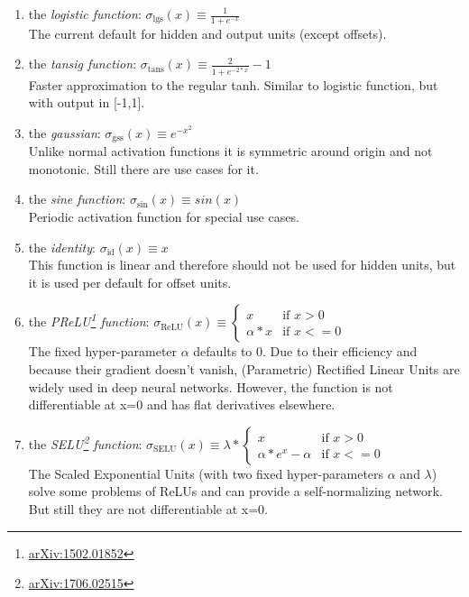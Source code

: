 \documentclass[11pt,a4paper,twoside]{article}
\newcommand{\logaf}{\sigma_{\text{lgs}}}
\newcommand{\tansaf}{\sigma_{\text{tans}}}
\newcommand{\gssaf}{\sigma_{\text{gss}}}
\newcommand{\sinaf}{\sigma_{\text{sin}}}
\newcommand{\idaf}{\sigma_{\text{id}}}
\newcommand{\reluaf}{\sigma_{\text{ReLU}}}
\newcommand{\seluaf}{\sigma_{\text{SELU}}}
\begin{document}
\begin{enumerate}
\item the \emph{logistic function}: $\logaf(x) \equiv \frac{1}{1+e^{-x}}$ \\
The current default for hidden and output units (except offsets).
\item the \emph{tansig function}: $\tansaf(x) \equiv \frac{2}{1+e^{-2*x}} - 1$ \\
Faster approximation to the regular tanh. Similar to logistic function, but with output in [-1,1].  
\item the \emph{gaussian}: $\gssaf(x) \equiv e^{-x^2}$ \\
Unlike normal activation functions it is symmetric around origin and not monotonic. Still there are use cases for it.
\item the \emph{sine function}: $\sinaf(x) \equiv sin(x)$ \\
Periodic activation function for special use cases.
\item the \emph{identity}: $\idaf(x) \equiv x$ \\
This function is linear and therefore should not be used for hidden units, but it is used per default for offset units.
\item the \emph{PReLU\footnote{\href{https://arxiv.org/abs/1502.01852}{arXiv:1502.01852}} function}: $\reluaf(x) \equiv 
\begin{cases}
  x & \text{if $x>0$} \\
  \alpha * x & \text{if $x<=0$}
\end{cases}$ \\
The fixed hyper-parameter $\alpha$ defaults to 0. Due to their efficiency and because their gradient doesn't vanish, (Parametric) Rectified Linear Units are widely used in deep neural networks. However, the function is not differentiable at x=0 and has flat derivatives elsewhere. 
\item the \emph{SELU\footnote{\href{https://arxiv.org/abs/1706.02515}{arXiv:1706.02515}} function}: $\seluaf(x) \equiv \lambda * 
\begin{cases}
  x & \text{if $x>0$} \\
  \alpha * e^{x}- \alpha & \text{if $x<=0$}
\end{cases}$ \\
The Scaled Exponential Units (with two fixed hyper-parameters $\alpha$ and $\lambda$) solve some problems of ReLUs and can provide a self-normalizing network. But still they are not differentiable at x=0. 

\end{enumerate}
\end{document}
